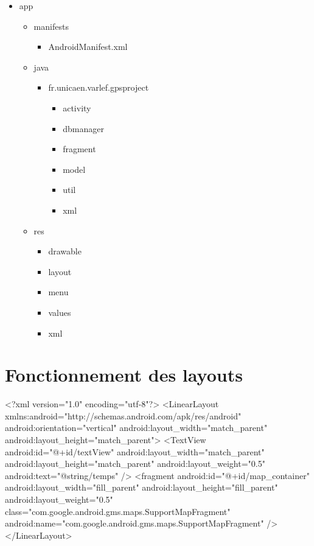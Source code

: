 \begin{multicols}{2}
\begin{itemize}
  \item app
     \begin{itemize}
       \item manifests
       \begin{itemize}
         \item AndroidManifest.xml
       \end{itemize}
       \item java
       \begin{itemize}
         \item fr.unicaen.varlef.gpsproject
         \begin{itemize}
           \item activity
           \item dbmanager
           \item fragment
           \item model
           \item util
           \item xml
         \end{itemize}
       \end{itemize}
       \item res
       \begin{itemize}
           \item drawable
           \item layout
           \item menu
           \item values
           \item xml
         \end{itemize}
     \end{itemize}
\end{itemize}\bigskip

\end{multicols}

\section{Fonctionnement des layouts}
\begin{xml}
<?xml version="1.0" encoding="utf-8"?>
<LinearLayout xmlns:android="http://schemas.android.com/apk/res/android"
    android:orientation="vertical" android:layout_width="match_parent"
    android:layout_height="match_parent">	
	<TextView
		android:id="@+id/textView"
    	android:layout_width="match_parent"
        android:layout_height="match_parent"        
        android:layout_weight="0.5"
        android:text="@string/temps" />
    <fragment
        android:id="@+id/map_container"
        android:layout_width="fill_parent"
        android:layout_height="fill_parent"
        android:layout_weight="0.5"
        class="com.google.android.gms.maps.SupportMapFragment"
        android:name="com.google.android.gms.maps.SupportMapFragment" />
</LinearLayout>
\end{xml}
\section{}



